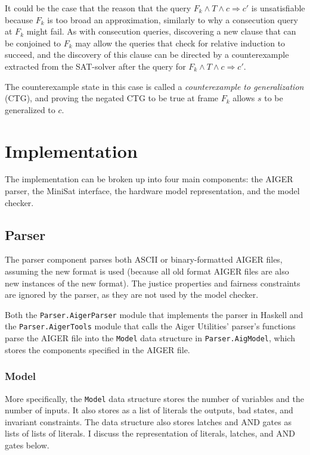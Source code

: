 \documentclass[12pt,a4paper,twoside,openright]{report}
\begin{document}
It could be the case that the reason that the query
$F_k \wedge T \wedge c \Rightarrow c'$ is unsatisfiable because
$F_k$ is too broad an approximation, similarly to why a consecution
query at $F_k$ might fail. As with consecution queries, discovering a
new clause that can be conjoined to $F_k$ may allow the queries that
check for relative induction to succeed, and the discovery of this
clause can be directed by a counterexample extracted from the
SAT-solver after the query for $F_k \wedge T \wedge c \Rightarrow c'$.

The counterexample state in this case is called a \emph{counterexample
to generalization} (CTG), and proving the negated CTG to be true at
frame $F_k$ allows $s$ to be generalized to $c$.


\chapter{Implementation}

The implementation can be broken up into four main components: the AIGER parser, the
MiniSat interface, the hardware model representation, and the model checker.


\section{Parser}

The parser component parses both ASCII or binary-formatted AIGER files,
assuming the new format is used (because all old format AIGER files are also
new instances of the new format). The justice properties and fairness constraints
are ignored by the parser, as they are not used by the model checker.

Both the \verb,Parser.AigerParser, module that implements the parser in Haskell and
the \verb,Parser.AigerTools, module that calls the Aiger Utilities' parser's functions
parse the AIGER file into the \verb,Model, data structure in \verb,Parser.AigModel,,
which stores the components specified in the AIGER file.

\subsection{Model}

More specifically, the \verb,Model, data structure stores the number of variables and
the number of inputs. It also stores as a list of literals the outputs, bad states,
and invariant constraints. The data structure also stores latches and AND gates as
lists of lists of literals. I discuss the representation of literals, latches, and
AND gates below.
\end{document}
